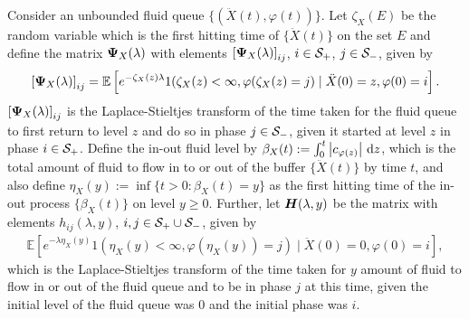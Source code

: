 Consider an unbounded fluid queue \(\{(\ddot X(t), \varphi(t))\}\). Let \(\zeta_X(E)\) be the random variable which is the first hitting time of \(\{\ddot X(t)\}\) on the set \(E\) and define the matrix \(\boldsymbol \Psi_X(\lambda)\) with elements \(\left[\boldsymbol \Psi_X(\lambda)\right]_{ij}\), \(i\in\mathcal{S}_+\), \(j\in\mathcal{S}_-\), given by
\begin{align}
	\left[\boldsymbol \Psi_X(\lambda)\right]_{ij} = \mathbb E\left[ e^{-\zeta_X(z)\lambda} 1(\zeta_X(z)<\infty, \varphi(\zeta_X(z)=j)\mid \ddot X(0)=z, \varphi(0)=i\right].
\end{align}
\(\left[\boldsymbol \Psi_X(\lambda)\right]_{ij}\) is the Laplace-Stieltjes transform of the time taken for the fluid queue to first return to level \(z\) and do so in phase \(j\in\mathcal{S}_-\), given it started at level \(z\) in phase \(i\in\mathcal{S}_+\). Define the in-out fluid level by $\beta_X(t) := \int_0^t \left| c_{\varphi(z)} \right|  \, \mathrm{d} z$, which is the total amount of fluid to flow in to or out of the buffer \(\{\ddot X(t)\}\) by time \(t\), and also define $\eta_X(y) := \inf \{t > 0: \beta_X(t) = y\}$ as the first hitting time of the in-out process \(\{\beta_X(t)\}\) on level \(y\geq 0\). Further, let \(\boldsymbol H(\lambda,y)\) be the matrix with elements \(h_{ij}(\lambda,y)\), \(i,j\in\mathcal{S}_+\cup\mathcal{S}_-\), given by
\begin{align}
	\mathbb E\left[e^{-\lambda \eta_X(y)}1(\eta_X(y)<\infty,\varphi(\eta_X(y))=j)\mid \ddot X(0)=0, \varphi(0)=i\right],
\end{align}
which is the Laplace-Stieltjes transform of the time taken for \(y\) amount of fluid to flow in or out of the fluid queue and to be in phase \(j\) at this time, given the initial level of the fluid queue was \(0\) and the initial phase was \(i\). 

